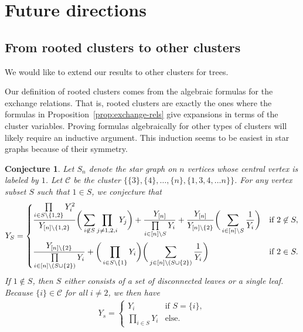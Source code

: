 \documentclass[pdftex]{sigma}
\numberwithin{equation}{section}
\newtheorem{Conjecture}[Theorem]{Conjecture}
\begin{document}
\section{Future directions}\label{sec:future}
\subsection{From rooted clusters to other clusters}

We would like to extend our results to other clusters for trees.

Our definition of rooted clusters comes from the algebraic formulas for the exchange relations. That is, rooted clusters are exactly the ones where the formulas in Proposition~\ref{prop:exchange-rels} give expansions in terms of the cluster variables. Proving formulas algebraically for other types of clusters will likely require an inductive argument. This induction seems to be easiest in star graphs because of their symmetry.

\begin{Conjecture}
Let $S_n$ denote the star graph on $n$ vertices whose central vertex is labeled by $1$. Let $\mathcal{C}$ be the cluster $\{ \{3 \}, \{ 4 \}, \dots, \{ n \}, \{ 1, 3, 4, \dots n \} \}$. For any vertex subset $S$ such that $1 \in S$, we conjecture that
\begin{align*}
 Y_S = \begin{cases}
 \displaystyle\frac{\prod\limits_{i \in S \backslash \{ 1, 2 \}} Y_i^2}{Y_{[n] \backslash \{ 1, 2 \}}} \bigg( \sum\limits_{i \not\in S} \prod\limits_{j \neq 1, 2, i} Y_j \bigg) + \frac{Y_{[n]}}{\prod\limits_{i \in [n] \backslash S} Y_i} + \frac{Y_{[n]}}{Y_{[n] \backslash \{ 2 \}}} \bigg( \sum\limits_{i \in [n] \backslash S} \frac{1}{Y_i} \bigg) & \textrm{if } 2 \not\in S, \vspace{2mm}\\
 \displaystyle \frac{Y_{[n] \backslash \{ 2 \}}}{\prod\limits_{i \in [n] \backslash (S \cup \{ 2 \})} Y_i} + \bigg(\prod\limits_{i \in S \backslash \{ 1 \}} Y_i \bigg) \bigg( \sum\limits_{j \in [n] \backslash (S \cup \{ 2 \})} \frac{1}{Y_i} \bigg) & \textrm{if } 2 \in S.
 \end{cases}
\end{align*}
If $1 \not\in S$, then $S$ either consists of a set of disconnected leaves or a single leaf. Because $\{ i \} \in \mathcal{C}$ for all $i \neq 2$, we then have
\begin{align*}
 Y_s = \begin{cases}
 Y_{i} & \textrm{if }S = \{ i \}, \\
 \prod\limits_{i \in S} Y_i & \textrm{else}.
 \end{cases}
\end{align*}
\end{Conjecture}
\end{document}
